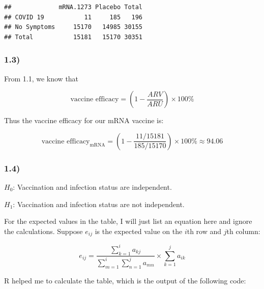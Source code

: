 \documentclass[
]{article}
\newenvironment{Shaded}{\begin{snugshade}}{\end{snugshade}}
\newcommand{\AttributeTok}[1]{\textcolor[rgb]{0.77,0.63,0.00}{#1}}
\newcommand{\DecValTok}[1]{\textcolor[rgb]{0.00,0.00,0.81}{#1}}
\newcommand{\FunctionTok}[1]{\textcolor[rgb]{0.00,0.00,0.00}{#1}}
\newcommand{\NormalTok}[1]{#1}
\newcommand{\OtherTok}[1]{\textcolor[rgb]{0.56,0.35,0.01}{#1}}
\newcommand{\SpecialCharTok}[1]{\textcolor[rgb]{0.00,0.00,0.00}{#1}}
\newcommand{\StringTok}[1]{\textcolor[rgb]{0.31,0.60,0.02}{#1}}
\begin{document}
\begin{verbatim}
##             mRNA.1273 Placebo Total
## COVID 19           11     185   196
## No Symptoms     15170   14985 30155
## Total           15181   15170 30351
\end{verbatim}

\hypertarget{section-2}{%
\subsubsection{1.3)}\label{section-2}}

From 1.1, we know that

\[
\text{vaccine efficacy} = (1 - \frac{ARV}{ARU}) \times 100\%
\]

Thus the vaccine efficacy for our mRNA vaccine is:

\[
\text{vaccine efficacy}_\text{mRNA} = (1 - \frac{11 / 15181}{185 / 15170} ) \times 100\% \approx 94.06%
\]

\hypertarget{section-3}{%
\subsubsection{1.4)}\label{section-3}}

\(H_0\): Vaccination and infection status are independent.

\(H_1\): Vaccination and infection status are not independent.

For the expected values in the table, I will just list an equation here
and ignore the calculations. Suppose \(e_{ij}\) is the expected value on
the \(i\)th row and \(j\)th column:

\[
e_{ij} = \frac{\sum_{k = 1}^i a_{kj}}{\sum_{m=1}^i \sum_{n=1}^j a_{mn}}\times \sum_{k=1}^j a_{ik}
\]

R helped me to calculate the table, which is the output of the following
code:

\begin{Shaded}
\end{Shaded}
\end{document}
